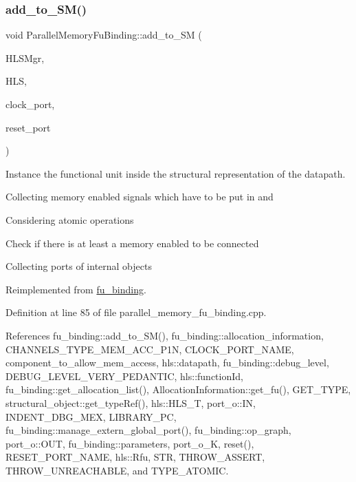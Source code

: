\subsubsection{\texorpdfstring{add\+\_\+to\+\_\+\+S\+M()}{add\_to\_SM()}}
{\footnotesize\ttfamily void Parallel\+Memory\+Fu\+Binding\+::add\+\_\+to\+\_\+\+SM (\begin{DoxyParamCaption}\item[{const \hyperlink{hls__manager_8hpp_acd3842b8589fe52c08fc0b2fcc813bfe}{H\+L\+S\+\_\+manager\+Ref}}]{H\+L\+S\+Mgr,  }\item[{const \hyperlink{hls_8hpp_a75d0c73923d0ddfa28c4843a802c73a7}{hls\+Ref}}]{H\+LS,  }\item[{\hyperlink{structural__objects_8hpp_a8ea5f8cc50ab8f4c31e2751074ff60b2}{structural\+\_\+object\+Ref}}]{clock\+\_\+port,  }\item[{\hyperlink{structural__objects_8hpp_a8ea5f8cc50ab8f4c31e2751074ff60b2}{structural\+\_\+object\+Ref}}]{reset\+\_\+port }\end{DoxyParamCaption})\hspace{0.3cm}{\ttfamily [virtual]}}



Instance the functional unit inside the structural representation of the datapath. 

Collecting memory enabled signals which have to be put in and

Considering atomic operations

Check if there is at least a memory enabled to be connected

Collecting ports of internal objects 

Reimplemented from \hyperlink{classfu__binding_a1485a3490fff093e44664db54ecdf39a}{fu\+\_\+binding}.



Definition at line 85 of file parallel\+\_\+memory\+\_\+fu\+\_\+binding.\+cpp.



References fu\+\_\+binding\+::add\+\_\+to\+\_\+\+S\+M(), fu\+\_\+binding\+::allocation\+\_\+information, C\+H\+A\+N\+N\+E\+L\+S\+\_\+\+T\+Y\+P\+E\+\_\+\+M\+E\+M\+\_\+\+A\+C\+C\+\_\+\+P1N, C\+L\+O\+C\+K\+\_\+\+P\+O\+R\+T\+\_\+\+N\+A\+ME, component\+\_\+to\+\_\+allow\+\_\+mem\+\_\+access, hls\+::datapath, fu\+\_\+binding\+::debug\+\_\+level, D\+E\+B\+U\+G\+\_\+\+L\+E\+V\+E\+L\+\_\+\+V\+E\+R\+Y\+\_\+\+P\+E\+D\+A\+N\+T\+IC, hls\+::function\+Id, fu\+\_\+binding\+::get\+\_\+allocation\+\_\+list(), Allocation\+Information\+::get\+\_\+fu(), G\+E\+T\+\_\+\+T\+Y\+PE, structural\+\_\+object\+::get\+\_\+type\+Ref(), hls\+::\+H\+L\+S\+\_\+T, port\+\_\+o\+::\+IN, I\+N\+D\+E\+N\+T\+\_\+\+D\+B\+G\+\_\+\+M\+EX, L\+I\+B\+R\+A\+R\+Y\+\_\+\+PC, fu\+\_\+binding\+::manage\+\_\+extern\+\_\+global\+\_\+port(), fu\+\_\+binding\+::op\+\_\+graph, port\+\_\+o\+::\+O\+UT, fu\+\_\+binding\+::parameters, port\+\_\+o\+\_\+K, reset(), R\+E\+S\+E\+T\+\_\+\+P\+O\+R\+T\+\_\+\+N\+A\+ME, hls\+::\+Rfu, S\+TR, T\+H\+R\+O\+W\+\_\+\+A\+S\+S\+E\+RT, T\+H\+R\+O\+W\+\_\+\+U\+N\+R\+E\+A\+C\+H\+A\+B\+LE, and T\+Y\+P\+E\+\_\+\+A\+T\+O\+M\+IC.

